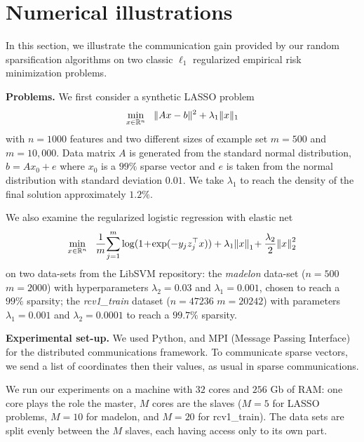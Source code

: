 \section{Numerical illustrations}\label{sec:spy_exps}

In this section, we illustrate the communication gain provided by our random sparsification algorithms on two classic $\ell_1$ regularized empirical risk minimization problems.

\medskip
\noindent
\textbf{Problems.}
We first consider a synthetic LASSO problem
$$
\min_{x\in \mathbb{R}^n} ~~\| Ax - b\|^2 + \lambda_1 \|x \|_1
$$
with $n=1000$ features and two different sizes of example set $m= 500$ and $m = 10,000$. Data matrix $A$ is generated from the standard normal distribution, $b = Ax_0 +e$ where $x_0$ is a $99\%$ sparse vector and $e$ is taken from the normal distribution with standard deviation $0.01$.  
We take $\lambda_1$ to reach the density of the final solution approximately $1.2\%$.

We also examine the regularized logistic regression with elastic net
 $$    \min_{x\in \mathbb{R}^n}~~\frac{1}{m}\!\sum_{j=1}^m \log(1 \!+\! \exp(-y_j z_j^{\top} x)) + \lambda_1\!\left\|x\right\|_1 \!+ \frac{\lambda_2}{2}\!\left\|x\right\|_2^2
 $$
on two data-sets from the LibSVM repository: the 
\emph{madelon} data-set ($n=500$ $m=2000$) 
with hyperparameters $\lambda_2 = 0.03$ and $\lambda_1 = 0.001$, chosen to reach a $99\%$ sparsity;
the \emph{rcv1\_train} dataset ($n=47236$ $m=20242$) with parameters $\lambda_1 = 0.001$ and $\lambda_2  = 0.0001$ to reach a $99.7\%$ sparsity.

\medskip
\noindent
\textbf{Experimental set-up.} We used Python, and MPI (Message Passing Interface) for the distributed communications framework. To communicate sparse vectors, we send a list of coordinates then their values, as usual in sparse communications. 

We run our experiments on a machine with $32$ cores and $256$ Gb of RAM: one core plays the role the master, $M$ cores are the slaves ($M=5$ for LASSO problems, $M=10$ for madelon, and $M=20$ for rcv1\_train). The data sets are split evenly between the $M$ slaves, each having access only to its own part.%

